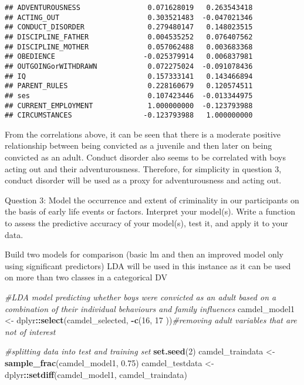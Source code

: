 \documentclass[]{article}
\newenvironment{Shaded}{\begin{snugshade}}{\end{snugshade}}
\newcommand{\KeywordTok}[1]{\textcolor[rgb]{0.13,0.29,0.53}{\textbf{#1}}}
\newcommand{\DecValTok}[1]{\textcolor[rgb]{0.00,0.00,0.81}{#1}}
\newcommand{\FloatTok}[1]{\textcolor[rgb]{0.00,0.00,0.81}{#1}}
\newcommand{\StringTok}[1]{\textcolor[rgb]{0.31,0.60,0.02}{#1}}
\newcommand{\CommentTok}[1]{\textcolor[rgb]{0.56,0.35,0.01}{\textit{#1}}}
\newcommand{\OperatorTok}[1]{\textcolor[rgb]{0.81,0.36,0.00}{\textbf{#1}}}
\newcommand{\NormalTok}[1]{#1}
\begin{document}
\begin{verbatim}
## ADVENTUROUSNESS                0.071628019   0.263543418
## ACTING_OUT                     0.303521483  -0.047021346
## CONDUCT_DISORDER               0.279480147   0.148023515
## DISCIPLINE_FATHER              0.004535252   0.076407562
## DISCIPLINE_MOTHER              0.057062488   0.003683368
## OBEDIENCE                     -0.025379914   0.006837981
## OUTGOINGorWITHDRAWN            0.072275024  -0.091078436
## IQ                             0.157333141   0.143466894
## PARENT_RULES                   0.228160679   0.120574511
## ses                            0.107423446  -0.013344975
## CURRENT_EMPLOYMENT             1.000000000  -0.123793988
## CIRCUMSTANCES                 -0.123793988   1.000000000
\end{verbatim}

From the correlations above, it can be seen that there is a moderate
positive relationship between being convicted as a juvenile and then
later on being convicted as an adult. Conduct disorder also seems to be
correlated with boys acting out and their adventurousness. Therefore,
for simplicity in question 3, conduct disorder will be used as a proxy
for adventurousness and acting out.

Question 3: Model the occurrence and extent of criminality in our
participants on the basis of early life events or factors. Interpret
your model(s). Write a function to assess the predictive accuracy of
your model(s), test it, and apply it to your data.

Build two models for comparison (basic lm and then an improved model
only using significant predictors) LDA will be used in this instance as
it can be used on more than two classes in a categorical DV

\begin{Shaded}
\begin{Highlighting}[]
\CommentTok{#LDA model predicting whether boys were convicted as an adult based on a combination of their individual behaviours and family influences}
\NormalTok{camdel_model1 <-}\StringTok{ }\NormalTok{dplyr}\OperatorTok{::}\KeywordTok{select}\NormalTok{(camdel_selected, }\OperatorTok{-}\KeywordTok{c}\NormalTok{(}\DecValTok{16}\NormalTok{, }\DecValTok{17}\NormalTok{ ))}\CommentTok{#removing adult variables that are not of interest}

\CommentTok{#splitting data into test and training set}
\KeywordTok{set.seed}\NormalTok{(}\DecValTok{2}\NormalTok{)}
\NormalTok{camdel_traindata <-}\StringTok{ }\KeywordTok{sample_frac}\NormalTok{(camdel_model1, }\FloatTok{0.75}\NormalTok{)}
\NormalTok{camdel_testdata  <-}\StringTok{ }\NormalTok{dplyr}\OperatorTok{::}\KeywordTok{setdiff}\NormalTok{(camdel_model1, camdel_traindata)}
\end{Highlighting}
\end{Shaded}
\end{document}
